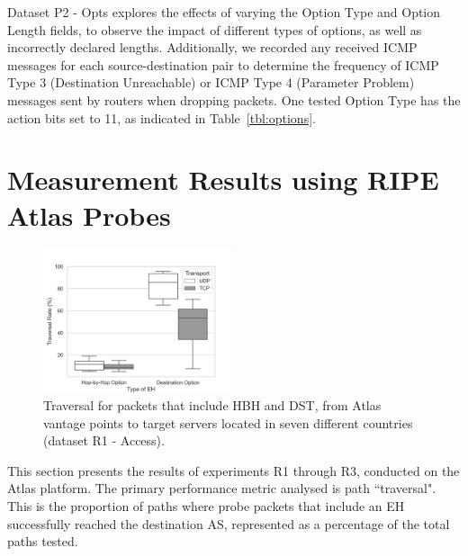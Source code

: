\documentclass[conference]{IEEEtran}
\begin{document}
Dataset P2 - Opts explores the effects of varying
the Option Type and Option Length fields, to observe the impact of
different types of options, as well as incorrectly declared lengths. Additionally, we recorded any received ICMP messages for each
source-destination pair to determine the frequency of ICMP Type 3 (Destination
Unreachable) or ICMP Type 4 (Parameter Problem) messages sent by routers when
dropping packets. One tested
Option Type has the action bits set to 11, as indicated in
Table~\ref{tbl:options}.





\section{Measurement Results using RIPE Atlas Probes} 
\label{sec:ripe-results}

\begin{figure}[t]
\centering
  \includegraphics[width=0.5\textwidth]{all_traversal.png}
  \caption{Traversal for packets that include HBH and DST, from Atlas vantage points to target servers located in seven different countries (dataset R1 - Access).}
  \label{fig:countrybox}
\end{figure}

This section presents the results of experiments R1 through R3, conducted on the Atlas platform. 
The primary performance metric analysed is path ``traversal".
This is the proportion of paths where probe packets that include an EH
successfully reached the destination AS, represented as a percentage of the total paths tested.
\end{document}
